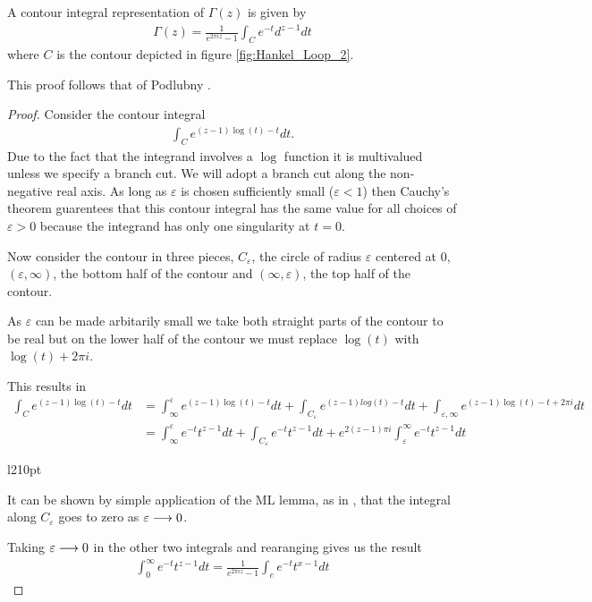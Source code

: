 \begin{lemma}
    \label{lem:contour_gamma}
    A contour integral representation of $ \Gamma(z) $ is given by
    \begin{align}
        \Gamma(z) = \frac{1}{e^{2 \pi i z} - 1} \int_{C} e^{-t}d^{z-1} dt
    \end{align}
where $ C $ is the contour depicted in figure \ref{fig:Hankel_Loop_2}.
\end{lemma}
This proof follows that of Podlubny \cite{Podlubny1999}.
\begin{proof}
Consider the contour integral
\begin{align*}
    \int_C e^{(z-1)\log(t) - t} dt.
\end{align*}
Due to the fact that the integrand involves a $ \log $ function it is multivalued unless we specify a branch
cut. We will adopt a branch cut along the non-negative real axis. As long as $ \varepsilon $ 
is chosen sufficiently small ($ \varepsilon < 1 $) then Cauchy's theorem guarentees that this contour 
integral has the same value for all choices of $ \varepsilon > 0 $ because the integrand has only one
singularity at $ t = 0 $.

Now consider the contour in three pieces, $ C_{\varepsilon} $, the circle of radius $ \varepsilon $ 
centered at 0, $ (\varepsilon, \infty) $, the bottom half of the contour and $ (\infty, \varepsilon) $, 
the top half of the contour. 

As $ \varepsilon $ can be made arbitarily small we take both straight parts of the contour to be
real but on the lower half of the contour we must replace $ \log(t) $ with $ \log(t) + 2\pi i $. 

This results in 
\begin{align*}
    \int_C e^{(z-1)\log(t)-t} dt &= \int_\infty^\varepsilon e^{(z-1)\log(t) - t} dt + \int_{C_\varepsilon} 
        e^{(z-1)log(t) - t} dt + \int_{\varepsilon, \infty} e^{(z-1)\log(t) - t + 2\pi i} dt \\
    &= \int_\infty^\varepsilon e^{-t}t^{z-1}dt + \int_{C_\varepsilon} e^{-t}t^{z-1}dt +
    e^{2(z-1)\pi i} \int_\varepsilon^\infty e^{-t}t^{z-1} dt
\end{align*}

\begin{wrapfigure}{l}{210pt}
    
    \caption{The Hankel contour C}
    \label{fig:Hankel_Loop_2}
\end{wrapfigure}

It can be shown by simple application of the ML lemma, as in \cite{Podlubny1999}, that the integral along
$ C_\varepsilon $ goes to zero as $ \varepsilon \longrightarrow 0 $.

Taking $ \varepsilon \longrightarrow 0 $ in the other two integrals and rearanging gives us the result
\begin{align}
    \label{eq:gamma_contour}
    \int_0^\infty e^{-t} t^{z-1} dt = \frac{1}{e^{2 \pi i z} - 1} \int_c e^{-t}t^{x-1} dt
\end{align}
\end{proof}

